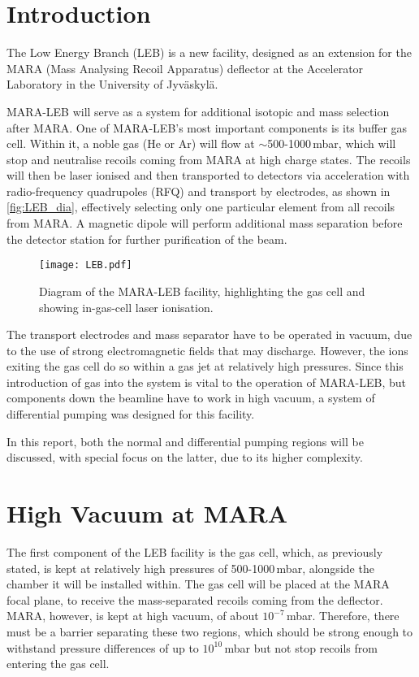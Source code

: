 





\section{Introduction}
\label{sec:intro}
The Low Energy Branch (LEB) is a new facility, designed as an extension for the MARA (Mass Analysing Recoil Apparatus) deflector at the Accelerator Laboratory in the University of Jyväskylä.

MARA-LEB will serve as a system for additional isotopic and mass selection after MARA. One of MARA-LEB's most important components is its buffer gas cell. Within it, a noble gas (He or Ar) will flow at $\sim$500-1000\,mbar, which will stop and neutralise recoils coming from MARA at high charge states. The recoils will then be laser ionised and then transported to detectors via acceleration with radio-frequency quadrupoles (RFQ) and transport by electrodes, as shown in \autoref{fig:LEB_dia}, effectively selecting only one particular element from all recoils from MARA. A magnetic dipole will perform additional mass separation before the detector station for further purification of the beam.

\begin{figure}[H]
    \centering
    \texttt{[image: LEB.pdf]}    
    \caption{Diagram of the MARA-LEB facility, highlighting the gas cell and showing in-gas-cell laser ionisation.}
    \label{fig:LEB_dia}
\end{figure}

The transport electrodes and mass separator have to be operated in vacuum, due to the use of strong electromagnetic fields that may discharge. However, the ions exiting the gas cell do so within a gas jet at relatively high pressures. Since this introduction of gas into the system is vital to the operation of MARA-LEB, but components down the beamline have to work in high vacuum, a system of {differential pumping} was designed for this facility. 

In this report, both the normal and differential pumping regions will be discussed, with special focus on the latter, due to its higher complexity. 
\newpage

\section{High Vacuum at MARA}
\label{sec:mara}
The first component of the LEB facility is the gas cell, which, as previously stated, is kept at relatively high pressures of 500-1000\,mbar, alongside the chamber it will be installed within. The gas cell will be placed at the MARA focal plane, to receive the mass-separated recoils coming from the deflector. MARA, however, is kept at high vacuum, of about $10^{-7}$\,mbar. Therefore, there must be a barrier separating these two regions, which should be strong enough to withstand pressure differences of up to  $10^{10}$\,mbar but not stop recoils from entering the gas cell.

